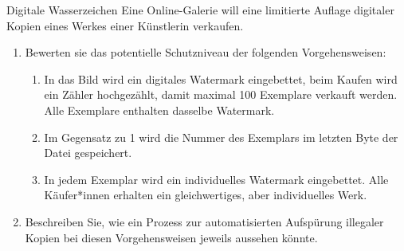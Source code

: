\documentclass{article}
\begin{document}
\begin{exercise}{Digitale Wasserzeichen}
  Eine Online-Galerie will eine limitierte Auflage digitaler Kopien eines Werkes einer Künstlerin verkaufen.
  \begin{enumerate}
    \item Bewerten sie das potentielle Schutzniveau der folgenden Vorgehensweisen:
          \begin{enumerate}
            \item In das Bild wird ein digitales Watermark eingebettet, beim Kaufen wird ein Zähler hochgezählt, damit maximal 100 Exemplare verkauft werden. Alle Exemplare enthalten dasselbe Watermark.
            \item Im Gegensatz zu 1 wird die Nummer des Exemplars im letzten Byte der Datei gespeichert.
            \item In jedem Exemplar wird ein individuelles Watermark eingebettet. Alle Käufer*innen erhalten ein gleichwertiges, aber individuelles Werk.
          \end{enumerate}
    \item Beschreiben Sie, wie ein Prozess zur automatisierten Aufspürung illegaler Kopien bei diesen Vorgehensweisen jeweils aussehen könnte.
  \end{enumerate}


\end{exercise}
\end{document}
